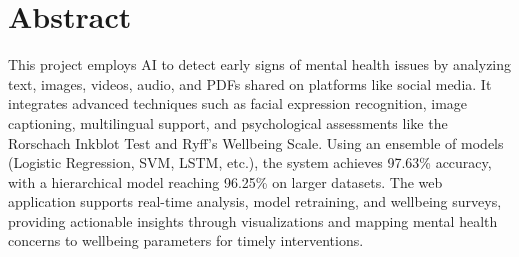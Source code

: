 

\section*{Abstract} 




\noindent
This project employs AI to detect early signs of mental health issues by analyzing text, images, videos, audio, and PDFs shared on platforms like social media. It integrates advanced techniques such as facial expression recognition, image captioning, multilingual support, and psychological assessments like the Rorschach Inkblot Test and Ryff's Wellbeing Scale. Using an ensemble of models (Logistic Regression, SVM, LSTM, etc.), the system achieves 97.63\% accuracy, with a hierarchical model reaching 96.25\% on larger datasets. The web application supports real-time analysis, model retraining, and wellbeing surveys, providing actionable insights through visualizations and mapping mental health concerns to wellbeing parameters for timely interventions.

